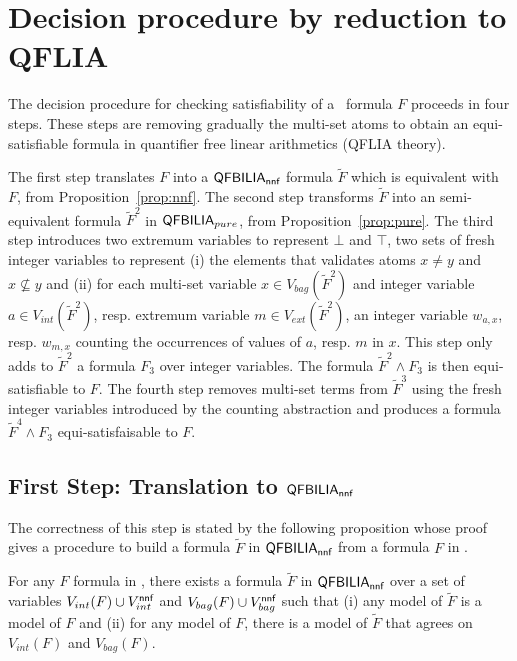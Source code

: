 
\section{Decision procedure by reduction to QFLIA}
\label{sec:fsimple}

The decision procedure for checking satisfiability of a \QFBILIA\ formula $F$ proceeds in four steps.
These steps are removing gradually the multi-set atoms to obtain an equi-satisfiable formula in quantifier free linear arithmetics (QFLIA theory).

The first step translates $F$ into a $\textsf{QFBILIA}_{\textsf{nnf}}$ formula $\tilde{F}$ which is equivalent with $F$, from  Proposition~\ref{prop:nnf}.
The second step transforms $\tilde{F}$ into an semi-equivalent formula $\tilde{F}^2$ in $\textsf{QFBILIA}_{pure}$, from  Proposition~\ref{prop:pure}.
The third step introduces two extremum variables to represent $\bot$ and $\top$, two sets of fresh integer variables to represent
(i) the elements that validates atoms $x\neq y$ and $x\nsubseteq y$ and
(ii) for each multi-set variable $x\in V_{bag}(\tilde{F}^2)$ and integer variable $a\in V_{int}(\tilde{F}^2)$, resp. extremum variable $m\in V_{ext}(\tilde{F}^2)$,
 an integer variable $w_{a,x}$, resp. $w_{m,x}$ counting the occurrences of values of $a$, resp. $m$ in $x$.
This step only adds to $\tilde{F}^2$ a formula $F_3$ over integer variables. The formula $\tilde{F}^2 \land F_3$ is then equi-satisfiable to $F$.
The fourth step removes multi-set terms from $\tilde{F}^3$ using the fresh integer variables introduced by the counting abstraction and produces a formula $\tilde{F}^4 \land F_3$ equi-satisfaisable to $F$.



\subsection{First Step: Translation to $\textsf{QFBILIA}_{\textsf{nnf}}$}
\label{ssec:dp-s1}

The correctness of this step is stated by the following proposition whose proof gives a procedure to build a formula $\tilde{F}$ in $\textsf{QFBILIA}_{\textsf{nnf}}$ from a formula $F$ in \QFBILIA.

\begin{myprop}
\label{prop:nnf}
For any $F$ formula in \QFBILIA, there exists a formula $\tilde{F}$ in $\textsf{QFBILIA}_{\textsf{nnf}}$ over a set of variables
$V_{int}(F)\cup V^{\textsf{nnf}}_{int}$ and $V_{bag}(F)\cup V^{\textsf{nnf}}_{bag}$ such that
(i) any model of $\tilde{F}$ is a model of $F$ and
(ii) for any model of $F$, there is a model of $\tilde{F}$ that agrees on $V_{int}(F)$ and $V_{bag}(F)$.
\end{myprop}

